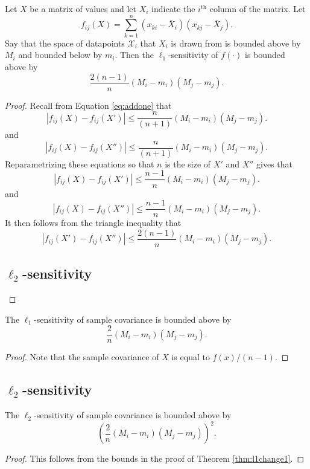 \documentclass[11pt]{scrartcl} %
\begin{document}
\begin{theorem}
\label{thm:l1change1}
Let $X$ be a matrix of values and let $X_i$ indicate the $i^{\text{th}}$ column of the matrix. Let
$$ f_{ij} (X)= \sum_{k=1}^n (x_{ki} - \bar{X}_i)(x_{kj} - \bar{X}_j).$$
Say that the space of datapoints $\mathcal{X}_i$ that $X_i$ is drawn from is bounded above by $M_i$ and bounded below by $m_i$. Then the $\ell_1$-sensitivity of $f(\cdot)$ is bounded above by
$$ \frac{2(n-1)}{n}  (M_i - m_i)(M_j - m_j).$$
\end{theorem}

\begin{proof}
Recall from Equation \ref{eq:addone} that 
$$ \left\vert f_{ij}(X) - f_{ij}(X') \right\vert \le \frac{n}{(n+1)}  (M_i - m_i)(M_j - m_j).$$
and
$$ \left\vert f_{ij}(X) - f_{ij}(X'') \right\vert \le \frac{n}{(n+1)}  (M_i - m_i)(M_j - m_j).$$
Reparametrizing these equations so that $n$ is the size of $X'$ and $X''$ gives that 
$$ \left\vert f_{ij}(X) - f_{ij}(X') \right\vert \le \frac{n-1}{n}  (M_i - m_i)(M_j - m_j).$$
and
$$ \left\vert f_{ij}(X) - f_{ij}(X'') \right\vert \le \frac{n-1}{n}  (M_i - m_i)(M_j - m_j).$$
It then follows from the triangle inequality that 
$$ \left\vert f_{ij}(X') - f_{ij}(X'') \right\vert \le \frac{2(n-1)}{n}  (M_i - m_i)(M_j - m_j).$$
\subsection{$\ell_2$-sensitivity}
\end{proof}

\begin{corollary}
The $\ell_1$-sensitivity of sample covariance is bounded above by
$$\frac{2}{n}  (M_i - m_i)(M_j - m_j).$$
\end{corollary}

\begin{proof}
Note that the sample covariance of $X$ is equal to $f(x)/(n-1)$.
\end{proof}

\subsection{$\ell_2$-sensitivity}

\begin{theorem}
The $\ell_2$-sensitivity of sample covariance is bounded above by 
$$\left(\frac{2}{n}  (M_i - m_i)(M_j - m_j)\right)^2.$$
\end{theorem}

\begin{proof}
This follows from the bounds in the proof of Theorem \ref{thm:l1change1}.
\end{proof}



\end{document}
